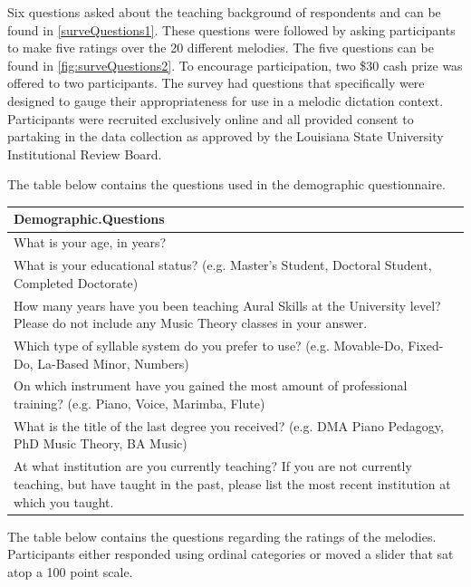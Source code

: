\documentclass[]{book}
\begin{document}
Six questions asked about the teaching background of respondents and can be found in \ref{surveQuestions1}.
These questions were followed by asking participants to make five ratings over the 20 different melodies.
The five questions can be found in \ref{fig:surveQuestions2}.
To encourage participation, two \$30 cash prize was offered to two participants.
The survey had questions that specifically were designed to gauge their appropriateness for use in a melodic dictation context.
Participants were recruited exclusively online and all provided consent to partaking in the data collection as approved by the Louisiana State University Institutional Review Board.

The table below contains the questions used in the demographic questionnaire.

\begin{tabular}{l}
\hline
Demographic.Questions\\
\hline
What is your age, in years?\\
\hline
What is your educational status? (e.g. Master's Student, Doctoral Student, Completed Doctorate)\\
\hline
How many years have you been teaching Aural Skills at the University level? Please do not include any Music Theory classes in your answer.\\
\hline
Which type of syllable system do you prefer to use? (e.g. Movable-Do, Fixed-Do, La-Based Minor, Numbers)\\
\hline
On which instrument have you gained the most amount of professional training? (e.g. Piano, Voice, Marimba, Flute)\\
\hline
What is the title of the last degree you received? (e.g. DMA Piano Pedagogy, PhD Music Theory, BA Music)\\
\hline
At what institution are you currently teaching? If you are not currently teaching, but have taught in the past, please list the most recent institution at which you taught.\\
\hline
\end{tabular}

The table below contains the questions regarding the ratings of the melodies.
Participants either responded using ordinal categories or moved a slider that sat atop a 100 point scale.
\end{document}
